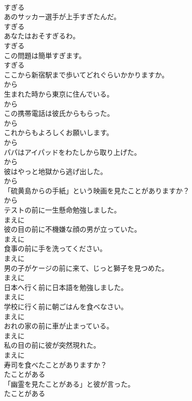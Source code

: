 \documentclass[8pt]{extreport}
\begin{document}
\begin{CJK}{UTF8}{min}
\\	すぎる
\\	あのサッカー選手が上手すぎたんだ。	
\\	すぎる
\\	あなたはおそすぎるわ。	
\\	すぎる
\\	この問題は簡単すぎます。	
\\	すぎる
\\	ここから新宿駅まで歩いてどれぐらいかかりますか。	
\\	から
\\	生まれた時から東京に住んでいる。	
\\	から
\\	この携帯電話は彼氏からもらった。	
\\	から
\\	これからもよろしくお願いします。	
\\	から
\\	パパはアイパッドをわたしから取り上げた。	
\\	から
\\	彼はやっと地獄から逃げ出した。	
\\	から
\\	「硫黄島からの手紙」という映画を見たことがありますか？	
\\	から
\\	テストの前に一生懸命勉強しました。	
\\	まえに
\\	彼の目の前に不機嫌な顔の男が立っていた。	
\\	まえに
\\	食事の前に手を洗ってください。	
\\	まえに
\\	男の子がケージの前に来て、じっと獅子を見つめた。	
\\	まえに
\\	日本へ行く前に日本語を勉強しました。	
\\	まえに
\\	学校に行く前に朝ごはんを食べなさい。	
\\	まえに
\\	おれの家の前に車が止まっている。	
\\	まえに
\\	私の目の前に彼が突然現れた。	
\\	まえに
\\	寿司を食べたことがありますか？	
\\	たことがある
\\	「幽霊を見たことがある」と彼が言った。	
\\	たことがある

\end{CJK}
\end{document}
